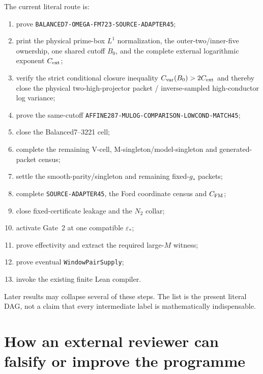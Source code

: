 \documentclass[11pt]{article}
\theoremstyle{definition}
\newcommand{\1}{\mathbf 1}
\begin{document}
The current literal route is:
\begin{enumerate}[leftmargin=1.8em]
\item prove \texttt{BALANCED7-OMEGA-FM723-SOURCE-ADAPTER45};
\item print the physical prime-box $L^1$ normalization, the outer-two/inner-five ownership,
      one shared cutoff $B_0$, and the complete external logarithmic exponent $C_{\rm ext}$;
\item verify the strict conditional closure inequality
      $C_{\rm var}(B_0)>2C_{\rm ext}$ and thereby close the physical two-high-projector
      packet / inverse-sampled high-conductor log variance;
\item prove the same-cutoff
      \texttt{AFFINE287-MULOG-COMPARISON-LOWCOND-MATCH45};
\item close the Balanced7--3221 cell;
\item complete the remaining V-cell, M-singleton/model-singleton and generated-packet census;
\item settle the smooth-parity/singleton and remaining fixed-$g_\ast$ packets;
\item complete \texttt{SOURCE-ADAPTER45}, the Ford coordinate census and $C_{\rm FM}$;
\item close fixed-certificate leakage and the $N_2$ collar;
\item activate Gate~2 at one compatible $\varepsilon_\ast$;
\item prove effectivity and extract the required large-$M$ witness;
\item prove eventual \texttt{WindowPairSupply};
\item invoke the existing finite Lean compiler.
\end{enumerate}
Later results may collapse several of these steps.  The list is the present literal DAG,
not a claim that every intermediate label is mathematically indispensable.


\section{How an external reviewer can falsify or improve the programme}
\label{sec:review-invitation}
\end{document}
